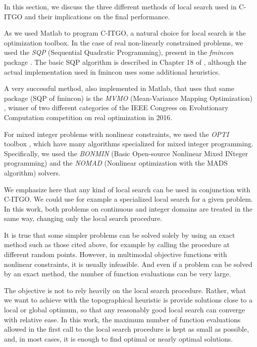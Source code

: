 In this section, we discuss the three different methods of local search used in C-ITGO and their implications on the final performance.

As we used Matlab to program C-ITGO, a natural choice for local search is the optimization toolbox. In the case of real non-linearly constrained problems, we used the \textit{SQP} (Sequential Quadratic Programming), present in the \textit{fmincon} package \citep{fmincon}. The basic SQP algorithm is described in Chapter 18 of \cite{Nocedal}, although the actual implementation used in fmincon uses some additional heuristics. 

A very successful method, also implemented in Matlab, that uses that same package (SQP of fmincon) is the \textit{MVMO} (Mean-Variance Mapping Optimization) \citep{MVMO}, winner of two different categories of the IEEE Congress on Evolutionary Computation competition on real optimization in 2016.

For mixed integer problems with nonlinear constraints, we used the \textit{OPTI} toolbox \citep{OPTI}, which have many algorithms specialized for mixed integer programming. Specifically, we used the \textit{BONMIN} (Basic Open-source Nonlinear Mixed INteger programming) \citep{BONMIN} and the \textit{NOMAD} (Nonlinear optimization with the MADS algorithm) \citep{NOMAD} solvers.

We emphasize here that any kind of local search can be used in conjunction with C-ITGO. We could use for example a specialized local search for a given problem. In this work, both problems on continuous and integer domains are treated in the same way, changing only the local search procedure.

It is true that some simpler problems can be solved solely by using an exact method such as those cited above, for example by calling the procedure at different random points. However, in multimodal objective functions with nonlinear constraints, it is usually infeasible. And even if a problem can be solved by an exact method, the number of function evaluations can be very large.

The objective is not to rely heavily on the local search procedure. Rather, what we want to achieve with the topographical heuristic is provide solutions close to a local or global optimum, so that any reasonably good local search can converge with relative ease. In this work, the maximum number of function evaluations allowed in the first call to the local search procedure is kept as small as possible, and, in most cases, it is enough to find optimal or nearly optimal solutions.



